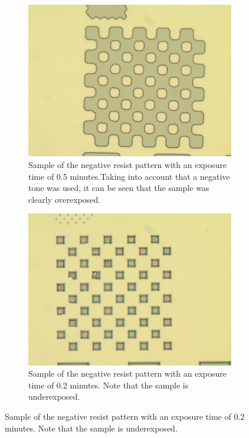 \begin{figure}[ht]
    \centering
    \begin{subfigure}[t]{0.3\linewidth}
        \centering
        \includegraphics[width=\textwidth]{data/b2d1.jpg}
	\caption{Sample of the negative resist pattern with an exposure time of 0.5 minutes.Taking into account that a negative tone was used, it can be seen that the sample was clearly overexposed.}
	\label{fig:b2d1}
    \end{subfigure}
    \hfill
    \begin{subfigure}[t]{0.3\linewidth}
        \centering
        \includegraphics[width=\textwidth]{data/b2h1.jpg}
	\caption{Sample of the negative resist pattern with an exposure time of 0.2 minutes. Note that the sample is underexposed.}

\end{subfigure}
\end{figure}

